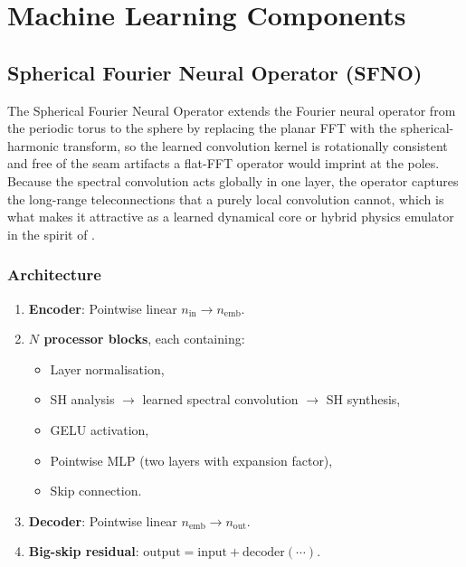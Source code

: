 \documentclass[11pt,twoside]{report}
\begin{document}
\chapter{Machine Learning Components}
\label{ch:ml}

\section{Spherical Fourier Neural Operator (SFNO)}

The Spherical Fourier Neural Operator \citep{Bonev2023} extends the Fourier
neural operator \citep{Li2021} from the periodic torus to the sphere by
replacing the planar FFT with the spherical-harmonic transform, so the learned
convolution kernel is rotationally consistent and free of the seam artifacts a
flat-FFT operator would imprint at the poles.  Because the spectral convolution
acts globally in one layer, the operator captures the long-range teleconnections
that a purely local convolution cannot, which is what makes it attractive as a
learned dynamical core or hybrid physics emulator in the spirit of
\citet{Kochkov2024}.

\subsection{Architecture}
\begin{enumerate}[nosep]
  \item \textbf{Encoder}: Pointwise linear $n_{\mathrm{in}}\to n_{\mathrm{emb}}$.
  \item \textbf{$N$ processor blocks}, each containing:
    \begin{itemize}[nosep]
      \item Layer normalisation,
      \item SH analysis $\to$ learned spectral convolution $\to$ SH synthesis,
      \item GELU activation,
      \item Pointwise MLP (two layers with expansion factor),
      \item Skip connection.
    \end{itemize}
  \item \textbf{Decoder}: Pointwise linear $n_{\mathrm{emb}}\to n_{\mathrm{out}}$.
  \item \textbf{Big-skip residual}: $\text{output}=\text{input}+\text{decoder}(\cdots)$.
\end{enumerate}
\end{document}
